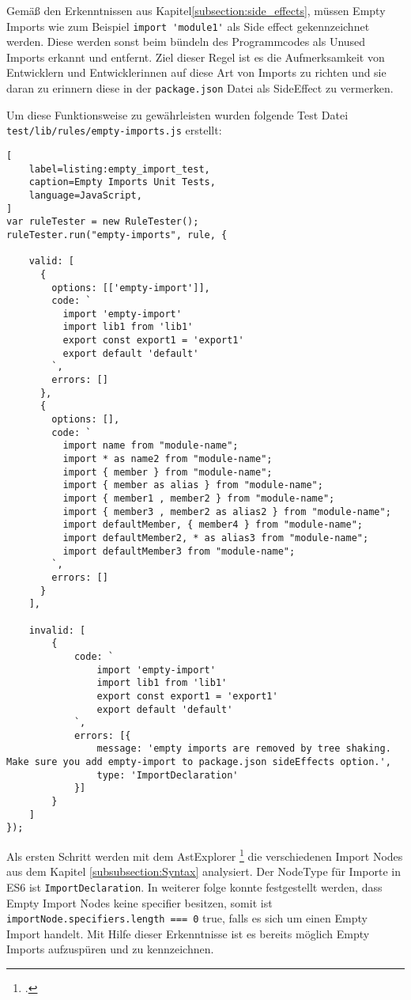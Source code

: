 Gemäß den Erkenntnissen aus  Kapitel\ref{subsection:side_effects}, müssen Empty Imports wie zum Beispiel \lstinline{import 'module1'} als Side effect gekennzeichnet werden. Diese werden sonst beim bündeln des Programmcodes als Unused Imports erkannt und entfernt. Ziel dieser Regel ist es die Aufmerksamkeit von Entwicklern und Entwicklerinnen auf diese Art von Imports zu richten und sie daran zu erinnern diese in der  \lstinline{package.json} Datei als SideEffect zu vermerken.

Um diese Funktionsweise zu gewährleisten wurden folgende Test Datei \lstinline{test/lib/rules/empty-imports.js} erstellt: 

\begin{lstlisting}[
    label=listing:empty_import_test,
	caption=Empty Imports Unit Tests,
	language=JavaScript,
]
var ruleTester = new RuleTester();
ruleTester.run("empty-imports", rule, {

    valid: [
      {
        options: [['empty-import']],
        code: `
          import 'empty-import'
          import lib1 from 'lib1'
          export const export1 = 'export1'
          export default 'default'
        `,
        errors: []
      },
      {
        options: [],
        code: `
          import name from "module-name";
          import * as name2 from "module-name";
          import { member } from "module-name";
          import { member as alias } from "module-name";
          import { member1 , member2 } from "module-name";
          import { member3 , member2 as alias2 } from "module-name";
          import defaultMember, { member4 } from "module-name";
          import defaultMember2, * as alias3 from "module-name";
          import defaultMember3 from "module-name";
        `,
        errors: []
      }
    ],

    invalid: [
        {
            code: `
                import 'empty-import'
                import lib1 from 'lib1'
                export const export1 = 'export1'
                export default 'default'
            `,
            errors: [{
                message: 'empty imports are removed by tree shaking. Make sure you add empty-import to package.json sideEffects option.',
                type: 'ImportDeclaration'
            }]
        }
    ]
});
\end{lstlisting}

Als ersten Schritt werden mit dem AstExplorer \footcite{https://astexplorer.net/ - besucht am 26.06.2018} die 
verschiedenen Import Nodes aus dem Kapitel \ref{subsubsection:Syntax} analysiert. Der NodeType für Importe in ES6 ist \lstinline{ImportDeclaration}. In weiterer folge konnte festgestellt werden, dass Empty Import Nodes keine specifier besitzen, somit ist \lstinline{importNode.specifiers.length === 0} true, falls es sich um einen Empty Import handelt. Mit Hilfe dieser Erkenntnisse ist es bereits möglich Empty Imports aufzuspüren und zu kennzeichnen.

